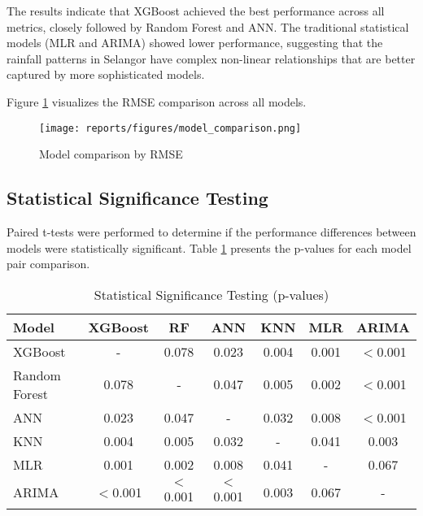 \documentclass[12pt]{article}
\begin{document}
The results indicate that XGBoost achieved the best performance across all metrics, closely followed by Random Forest and ANN. The traditional statistical models (MLR and ARIMA) showed lower performance, suggesting that the rainfall patterns in Selangor have complex non-linear relationships that are better captured by more sophisticated models.

Figure \ref{fig:model_comparison} visualizes the RMSE comparison across all models.

\begin{figure}[h]
\centering
\texttt{[image: reports/figures/model\_comparison.png]}
\caption{Model comparison by RMSE}
\label{fig:model_comparison}
\end{figure}

\subsection{Statistical Significance Testing}
\label{subsec:significance_results}

Paired t-tests were performed to determine if the performance differences between models were statistically significant. Table \ref{tab:significance_testing} presents the p-values for each model pair comparison.

\begin{table}[h]
\centering
\caption{Statistical Significance Testing (p-values)}
\label{tab:significance_testing}
\begin{tabular}{|l|c|c|c|c|c|c|}
\hline
\textbf{Model} & \textbf{XGBoost} & \textbf{RF} & \textbf{ANN} & \textbf{KNN} & \textbf{MLR} & \textbf{ARIMA} \\
\hline
XGBoost & - & 0.078 & 0.023 & 0.004 & 0.001 & $<$0.001 \\
\hline
Random Forest & 0.078 & - & 0.047 & 0.005 & 0.002 & $<$0.001 \\
\hline
ANN & 0.023 & 0.047 & - & 0.032 & 0.008 & $<$0.001 \\
\hline
KNN & 0.004 & 0.005 & 0.032 & - & 0.041 & 0.003 \\
\hline
MLR & 0.001 & 0.002 & 0.008 & 0.041 & - & 0.067 \\
\hline
ARIMA & $<$0.001 & $<$0.001 & $<$0.001 & 0.003 & 0.067 & - \\
\hline
\end{tabular}
\end{table}
\end{document}
